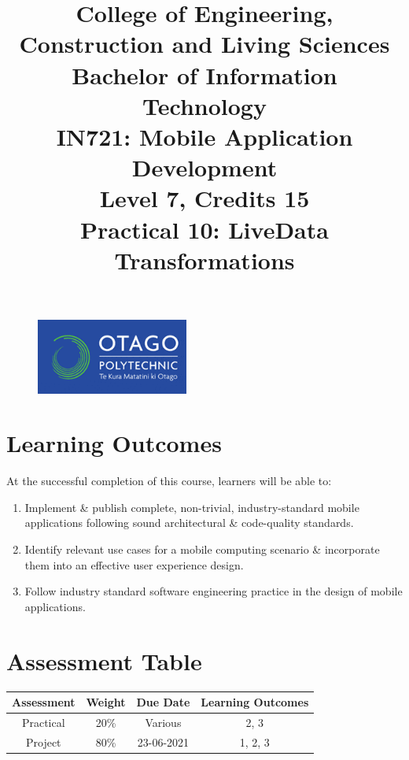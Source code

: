 \documentclass{article}
\author{}
\begin{document}
\begin{figure}
    \centering
    \includegraphics[width=50mm]{../img/logo.png}
\end{figure}

\title{College of Engineering, Construction and Living Sciences\\Bachelor of Information Technology\\IN721: Mobile Application Development\\Level 7, Credits 15\\\textbf{Practical 10: LiveData Transformations}}
\date{}
\maketitle

\section*{Learning Outcomes}
At the successful completion of this course, learners will be able to: 
\begin{enumerate}
	\item Implement \& publish complete, non-trivial, industry-standard mobile applications following sound architectural \& code-quality standards.
	\item Identify relevant use cases for a mobile computing scenario \& incorporate them into an effective user experience design.
	\item Follow industry standard software engineering practice in the design of mobile applications.
\end{enumerate} 


\section*{Assessment Table}
\renewcommand{\arraystretch}{1.5}	
\begin{tabular}{|c|c|c|c|}
	\hline
	\textbf{Assessment} & \textbf{Weight} & \textbf{Due Date} & \textbf{Learning Outcomes} \\ \hline
	Practical           & 20\%            & Various           & 2, 3                       \\ \hline
	Project             & 80\%            & 23-06-2021        & 1, 2, 3                    \\ \hline
\end{tabular} 

 
\end{document}
